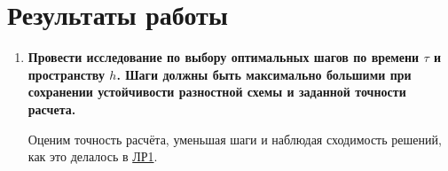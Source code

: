 \documentclass[a4paper,oneside,12pt]{extreport}
\begin{document}
\pagebreak
\section*{Результаты работы}

\begin{enumerate}
	\item \textbf{Провести исследование по выбору оптимальных шагов по времени $\tau$ и пространству $h$. Шаги должны быть максимально большими при сохранении устойчивости разностной схемы и заданной точности расчета.}

	Оценим точность расчёта, уменьшая шаги и наблюдая сходимость решений, как это делалось в \href{ftp://eufs.bmstu.ru/19426610-bd1a-11e6-93f1-005056960017/27-03-2020-%D0%97%D0%B0%D0%B4%D0%B0%D0%BD%D0%B8%D0%B5_%D0%BD%D0%B0_%D0%BB%D0%B0%D0%B1_%D1%80%D0%B0%D0%B1_%E2%84%961.doc}{ЛР1}.


\end{enumerate}
\end{document}
